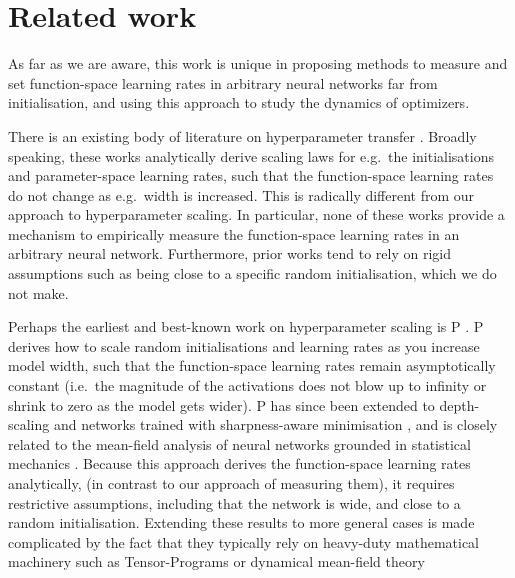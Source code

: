 \section{Related work}
As far as we are aware, this work is unique in proposing methods to measure and set function-space learning rates in arbitrary neural networks far from initialisation, and using this approach to study the dynamics of optimizers.

There is an existing body of literature on hyperparameter transfer \citep[e.g.\ ][]{yang2022featurelearninginfinitewidthneural,bordelon2023depthwisehyperparametertransferresidual,large2024scalableoptimizationmodularnorm, yaida2022metaprincipledfamilyhyperparameterscaling}. Broadly speaking, these works analytically derive scaling laws for e.g.\ the initialisations and parameter-space learning rates, such that the function-space learning rates do not change as e.g.\ width is increased.
This is radically different from our approach to hyperparameter scaling.
In particular, none of these works provide a mechanism to empirically measure the function-space learning rates in an arbitrary neural network.
Furthermore, prior works tend to rely on rigid assumptions such as being close to a specific random initialisation, which we do not make.

Perhaps the earliest and best-known work on hyperparameter scaling is \textmu{}P \citep{yang2022featurelearninginfinitewidthneural}.
\textmu{}P derives how to scale random initialisations and learning rates as you increase model width, such that the function-space learning rates remain asymptotically constant (i.e.\ the magnitude of the activations does not blow up to infinity or shrink to zero as the model gets wider). \textmu{}P has since been extended to depth-scaling \citep{yang2023tensorprogramsvifeature,bordelon2023depthwisehyperparametertransferresidual} and networks trained with sharpness-aware minimisation \citep{haas2024boldsymbolmumathbfp2effectivesharpnessaware}, and is closely related to the mean-field analysis of neural networks grounded in statistical mechanics \citep{Mei_2018,Geiger_2020,bordelon2022selfconsistentdynamicalfieldtheory,Rotskoff_2022}.
Because this approach derives the function-space learning rates analytically, (in contrast to our approach of measuring them), it requires restrictive assumptions, including that the network is wide, and close to a random initialisation. Extending these results to more general cases is made complicated by the fact that they typically rely on heavy-duty mathematical machinery such as Tensor-Programs \citep{yang2021tensorprogramsiwide, yang2020tensorprogramsiineural, yang2021tensorprogramsiiineural, yang2022featurelearninginfinitewidthneural, yang2022tensorprogramsvtuning, yang2023tensorprogramsvifeature} or dynamical mean-field theory \citep{bordelon2022selfconsistentdynamicalfieldtheory, bordelon2023dynamicsfinitewidthkernel, bordelon2023depthwisehyperparametertransferresidual, bordelon2024infinitelimitsmultiheadtransformer}

